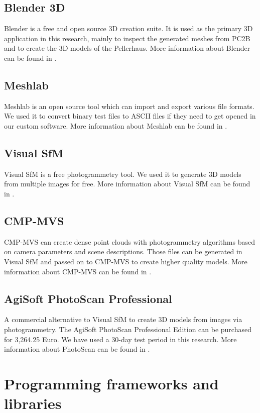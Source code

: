\subsection{Blender 3D}
Blender is a free and open source 3D creation suite. It is used as the primary 3D application in this research, mainly to inspect the generated meshes from PC2B and to create the 3D models of the Pellerhaus. More information about Blender can be found in \parencite{appendix_blender}.

\subsection{Meshlab}
Meshlab is an open source tool which can import and export various file formats. We used it to convert binary test files to ASCII files if they need to get opened in our custom software. More information about Meshlab can be found in \parencite{appendix_meshlab}.

\subsection{Visual SfM}
\label{appendix_visual_sfm}
Visual SfM is a free photogrammetry tool. We used it to generate 3D models from multiple images for free. More information about Visual SfM can be found in \parencite{appendix_visualsfm}.

\subsection{CMP-MVS}
CMP-MVS can create dense point clouds with photogrammetry algorithms based on camera parameters and scene descriptions. Those files can be generated in Visual SfM and passed on to CMP-MVS to create higher quality models. More information about CMP-MVS can be found in \parencite{appendix_cmp-mvs}.

\subsection{AgiSoft PhotoScan Professional}
A commercial alternative to Visual SfM to create 3D models from images via photogrammetry. The AgiSoft PhotoScan Professional Edition can be purchased for 3,264.25 Euro. We have used a 30-day test period in this research. More information about PhotoScan can be found in \parencite{appendix_agisoft_photoscan}.


\section{Programming frameworks and libraries}

